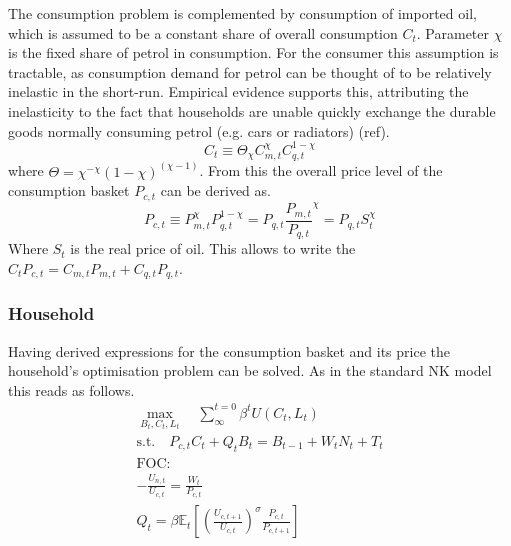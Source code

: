 \documentclass[12pt,a4paper,english]{article} %
\newcommand{\E}{\mathbb{E}} %
\begin{document}
	The consumption problem is complemented by consumption of imported oil, which is assumed to be a constant share of overall consumption $C_t$. Parameter $\chi$ is the fixed share of petrol in consumption. For the consumer this assumption is tractable, as consumption demand for petrol can be thought of to be relatively inelastic in the short-run. Empirical evidence supports this, attributing the inelasticity to the fact that households are unable quickly exchange the durable goods normally consuming petrol (e.g. cars or radiators) (ref). 
	\begin{equation}
		C_t \equiv \Theta_\chi C_{m,t}^\chi C_{q,t}^{1-\chi}
	\end{equation}
	where $\Theta = \chi^{-\chi}(1-\chi)^{(\chi-1)}$. From this the overall price level of the consumption basket $P_{c,t}$ can be derived as.
	\begin{equation}
		P_{c,t} \equiv P_{m,t}^\chi P_{q,t}^{1-\chi} 
			= P_{q,t} \frac{P_{m,t}}{P_{q,t}}^\chi
			= P_{q,t} S_t^\chi
	\end{equation}
	Where $S_t$ is the real price of oil. This allows to write the $C_t P_{c,t} = C_{m,t}P_{m,t} + C_{q,t}P_{q,t}$.

	\subsubsection{Household}
	Having derived expressions for the consumption basket and its price the household's optimisation problem can be solved. As in the standard NK model this reads as follows. 
	\begin{equation}
		\begin{aligned}
			\max_{B_t, C_t, L_t} \quad \sum_{\infty}^{t=0} \beta^{t} U(C_{t}, L_{t}) \\
			\textrm{s.t.} \quad P_{c,t} C_t + Q_t B_t = B_{t-1} + W_t N_t + T_t \\
			\textrm{FOC:} \\
			- \frac{U_{n,t}}{U_{c, t}} = \frac{W_t}{P_{c,t}}\\
			Q_t = \beta \E_t \left[ \left( \frac{U_{c, t+1}}{U_{c,t}} \right)^\sigma \frac{P_{c,t}}{P_{c,t+1}} \right] 			
		\end{aligned}
	\end{equation}
\end{document}
